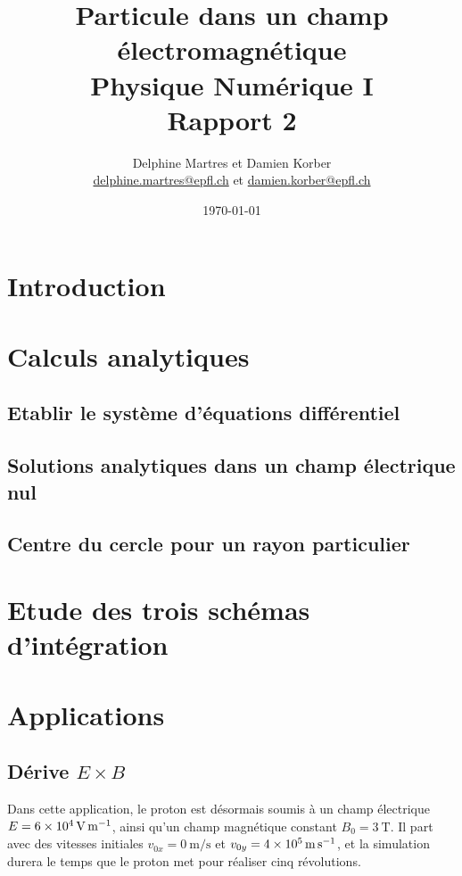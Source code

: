 \documentclass[a4paper,12pt,twoside]{article}
\newcommand{\mail}[1]{{\href{mailto:#1}{#1}}}
\begin{document}
\title{Particule dans un champ électromagnétique\\{\small Physique Numérique I}\\{\small Rapport 2}}
\date{\today}
\author{Delphine Martres et Damien Korber\\{\small \mail{delphine.martres@epfl.ch} et \mail{damien.korber@epfl.ch}}}
\maketitle
\tableofcontents %

\baselineskip=16pt
\parindent=15pt
\parskip=5pt




\section{Introduction}

\section{Calculs analytiques}
\subsection{Etablir le système d'équations différentiel}

\subsection{Solutions analytiques dans un champ électrique nul}

\subsection{Centre du cercle pour un rayon particulier}

\section{Etude des trois schémas d'intégration}
\section{Applications}
\subsection{Dérive $E\times B$}
Dans cette application, le proton est désormais soumis à un champ électrique $E=\SI{6d4}{\volt\per\meter}$, ainsi qu'un champ magnétique constant $B_0 = \SI{3}{\tesla}$.
Il part avec des vitesses initiales $v_{0x}=\SI{0}{\meter\per\second}$ et $v_{0y}=\SI{4d5}{\meter\per\second}$, et la simulation durera le temps que le proton met pour réaliser cinq révolutions.
\end{document}

